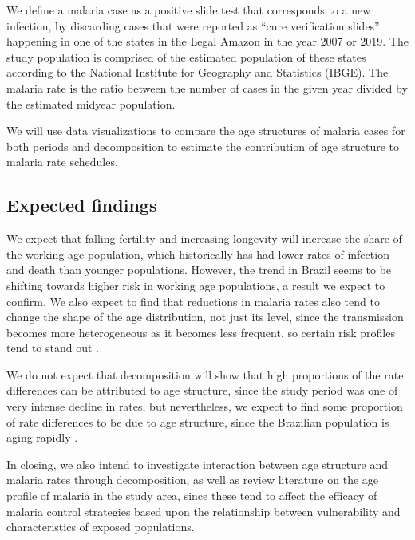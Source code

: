\documentclass[
  12pt,
]{article}
\begin{document}
We define a malaria case as a positive slide test that corresponds to a new infection, by discarding cases that were reported as ``cure verification slides'' happening in one of the states in the Legal Amazon in the year 2007 or 2019. The study population is comprised of the estimated population of these states according to the National Institute for Geography and Statistics (IBGE). The malaria rate is the ratio between the number of cases in the given year divided by the estimated midyear population.

We will use data visualizations to compare the age structures of malaria cases for both periods and decomposition \citep{prestonDemographyMeasuringModeling2000} to estimate the contribution of age structure to malaria rate schedules.

\hypertarget{expected-findings}{%
\subsection{Expected findings}\label{expected-findings}}

We expect that falling fertility and increasing longevity will increase the share of the working age population, which historically has had lower rates of infection and death than younger populations\citep{meloEvaluationMalariaElimination2020}. However, the trend in Brazil seems to be shifting towards higher risk in working age populations, a result we expect to confirm. We also expect to find that reductions in malaria rates also tend to change the shape of the age distribution, not just its level, since the transmission becomes more heterogeneous as it becomes less frequent, so certain risk profiles tend to stand out \citep{lanaTopQuantifyingUnequal2021}.

We do not expect that decomposition will show that high proportions of the rate differences can be attributed to age structure, since the study period was one of very intense decline in rates, but nevertheless, we expect to find some proportion of rate differences to be due to age structure, since the Brazilian population is aging rapidly \citep{camaranoPopulacaoBrasileiraSeus2014}.

In closing, we also intend to investigate interaction between age structure and malaria rates through decomposition, as well as review literature on the age profile of malaria in the study area, since these tend to affect the efficacy of malaria control strategies based upon the relationship between vulnerability and characteristics of exposed populations.
\end{document}
